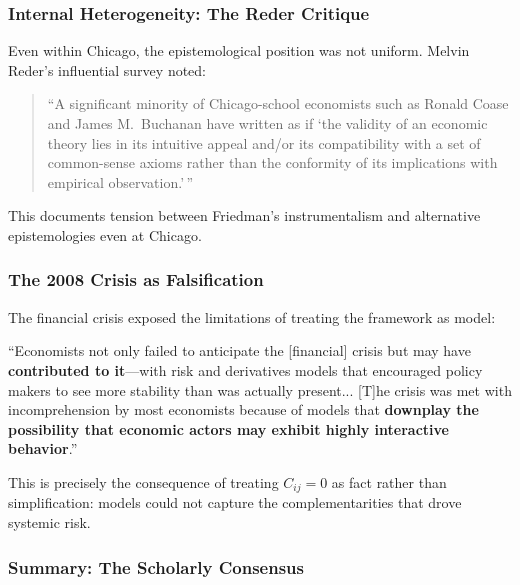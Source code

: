 \subsubsection{Internal Heterogeneity: The Reder Critique}

Even within Chicago, the epistemological position was not uniform.
Melvin Reder's influential survey noted:

\begin{quote}
``A significant minority of Chicago-school economists such as Ronald Coase and
James M.\ Buchanan have written as if `the validity of an economic theory lies in
its intuitive appeal and/or its compatibility with a set of common-sense axioms
rather than the conformity of its implications with empirical observation.'\,''
\citep{reder1982chicago}
\end{quote}

This documents tension between Friedman's instrumentalism and alternative
epistemologies even at Chicago.

\subsubsection{The 2008 Crisis as Falsification}

The financial crisis exposed the limitations of treating the framework as model:

\begin{tcolorbox}[colback=red!5!white, colframe=red!75!black,
    title=\textbf{Colander et al.\ (2009): Systemic Failure}]

``Economists not only failed to anticipate the [financial] crisis but may have
\textbf{contributed to it}---with risk and derivatives models that encouraged
policy makers to see more stability than was actually present... [T]he crisis
was met with incomprehension by most economists because of models that
\textbf{downplay the possibility that economic actors may exhibit highly
interactive behavior}.'' \citep{colander2009crisis}

\end{tcolorbox}

This is precisely the consequence of treating $C_{ij} = 0$ as fact rather than
simplification: models could not capture the complementarities that drove
systemic risk.

\subsubsection{Summary: The Scholarly Consensus}

